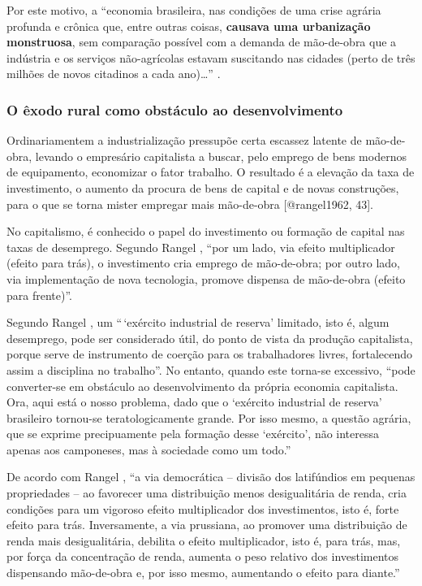 \documentclass[
	12pt,				%
	oneside,			%
	a4paper,			%
	chapter=TITLE,		%
	section=TITLE,		%
	english,			%
	brazil				%
	]{abntex2}
\begin{document}
Por este motivo, a ``economia brasileira, nas condições de uma crise
agrária profunda e crônica que, entre outras coisas, \textbf{causava uma
urbanização monstruosa}, sem comparação possível com a demanda de
mão-de-obra que a indústria e os serviços não-agrícolas estavam
suscitando nas cidades (perto de três milhões de novos citadinos a cada
ano)\ldots{}'' \autocite[134]{rangel1986b}.

\subsubsection{O êxodo rural como obstáculo ao
desenvolvimento}\label{o-uxeaxodo-rural-como-obstuxe1culo-ao-desenvolvimento}
\begin{citacao}
Ordinariamentem a industrialização pressupõe certa escassez latente de 
mão-de-obra, levando o empresário capitalista a buscar, pelo emprego de bens
modernos de equipamento, economizar o fator trabalho. O resultado é a elevação 
da taxa de investimento, o aumento da procura de bens de capital e de novas
construções, para o que se torna mister empregar mais mão-de-obra 
[@rangel1962, 43].
\end{citacao}
No capitalismo, é conhecido o papel do investimento ou formação de
capital nas taxas de desemprego. Segundo Rangel
\autocite*[156]{rangel1988}, ``por um lado, via efeito multiplicador
(efeito para trás), o investimento cria emprego de mão-de-obra; por
outro lado, via implementação de nova tecnologia, promove dispensa de
mão-de-obra (efeito para frente)''.

Segundo Rangel \autocite[142]{rangel1986c}, um ``\,`exército industrial
de reserva' limitado, isto é, algum desemprego, pode ser considerado
útil, do ponto de vista da produção capitalista, porque serve de
instrumento de coerção para os trabalhadores livres, fortalecendo assim
a disciplina no trabalho''. No entanto, quando este torna-se excessivo,
``pode converter-se em obstáculo ao desenvolvimento da própria economia
capitalista. Ora, aqui está o nosso problema, dado que o `exército
industrial de reserva' brasileiro tornou-se teratologicamente grande.
Por isso mesmo, a questão agrária, que se exprime precipuamente pela
formação desse `exército', não interessa apenas aos camponeses, mas à
sociedade como um todo.''

De acordo com Rangel \autocite*[156]{rangel1988}, ``a via democrática --
divisão dos latifúndios em pequenas propriedades -- ao favorecer uma
distribuição menos desigualitária de renda, cria condições para um
vigoroso efeito multiplicador dos investimentos, isto é, forte efeito
para trás. Inversamente, a via prussiana, ao promover uma distribuição
de renda mais desigualitária, debilita o efeito multiplicador, isto é,
para trás, mas, por força da concentração de renda, aumenta o peso
relativo dos investimentos dispensando mão-de-obra e, por isso mesmo,
aumentando o efeito para diante.''
\end{document}
